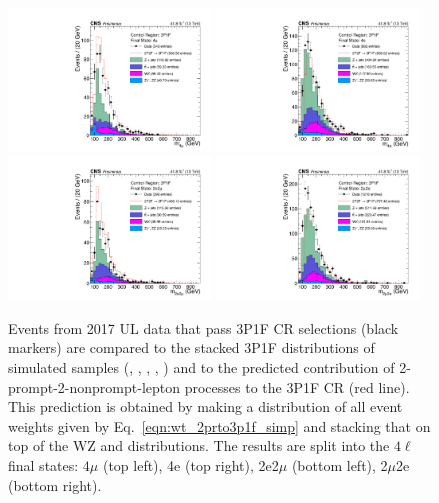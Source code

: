 \begin{figure}[!htbp]
	\begin{center}
		\includegraphics[width=0.48\textwidth]{figures/higgsmassmeas/redbkg/cr/UL2017_CR_3P1F_4mu.pdf}
		\includegraphics[width=0.48\textwidth]{figures/higgsmassmeas/redbkg/cr/UL2017_CR_3P1F_4e.pdf}
		\includegraphics[width=0.48\textwidth]{figures/higgsmassmeas/redbkg/cr/UL2017_CR_3P1F_2e2mu.pdf}
		\includegraphics[width=0.48\textwidth]{figures/higgsmassmeas/redbkg/cr/UL2017_CR_3P1F_2mu2e.pdf}
		\caption{
			Events from 2017 UL data that pass 3P1F CR selections (black markers) 
			are compared to the stacked 3P1F distributions of simulated samples
			(\Zplusjets, \ttbarplusjets, \WZ, \ZZ, \Zgammastar)
			and to the predicted contribution of 2-prompt-2-nonprompt-lepton processes to the 3P1F CR (red line).
			This prediction is obtained by making a distribution of all event weights given by Eq.~\ref{eqn:wt_2prto3p1f_simp} and stacking that on top of the WZ and \ZZ distributions.
			The results are split into the $4\ell$ final states:
			$4\mu$ (top left), 4e (top right), 2e2$\mu$ (bottom left), 2$\mu$2e (bottom right).
		}
		\label{cr_plots_3p1f_2017}
	\end{center}
\end{figure}
